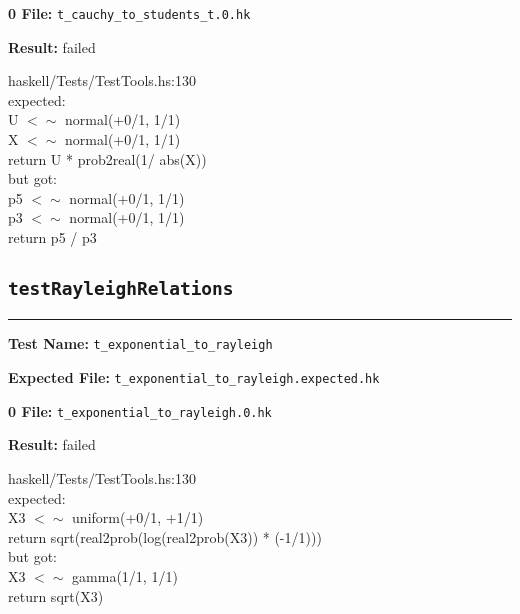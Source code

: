 \documentclass[11pt]{article}
\begin{document}
\bigskip
\textbf{0 File:} {\tt t\_cauchy\_to\_students\_t.0.hk}

\bigskip


\bigskip
\textbf{Result:} failed

\bigskip
\noindent


\bigskip
\noindent
haskell/Tests/TestTools.hs:130\\expected:\\U $<\sim$ normal(+0/1, 1/1)\\X $<\sim$ normal(+0/1, 1/1)\\return U * prob2real(1/ abs(X))\\but got:\\p5 $<\sim$ normal(+0/1, 1/1)\\p3 $<\sim$ normal(+0/1, 1/1)\\return p5 / p3\\

\subsection{{\tt testRayleighRelations}}

\hrule

\bigskip
\textbf{Test Name:} {\tt t\_exponential\_to\_rayleigh}

\textbf{Expected File:} {\tt t\_exponential\_to\_rayleigh.expected.hk}

\bigskip


\bigskip
\textbf{0 File:} {\tt t\_exponential\_to\_rayleigh.0.hk}

\bigskip


\bigskip
\textbf{Result:} failed

\bigskip
\noindent


\bigskip
\noindent
haskell/Tests/TestTools.hs:130\\expected:\\X3 $<\sim$ uniform(+0/1, +1/1)\\return sqrt(real2prob(log(real2prob(X3)) * (-1/1)))\\but got:\\X3 $<\sim$ gamma(1/1, 1/1)\\return sqrt(X3)\\
\end{document}

